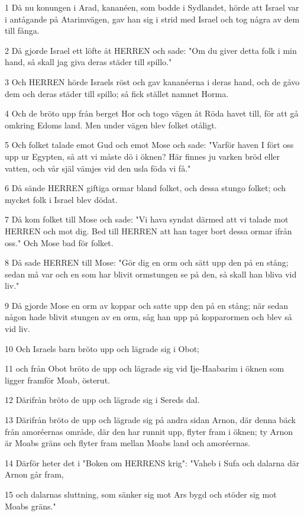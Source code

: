 \par 1 Då nu konungen i Arad, kananéen, som bodde i Sydlandet, hörde att Israel var i antågande på Atarimvägen, gav han sig i strid med Israel och tog några av dem till fånga.
\par 2 Då gjorde Israel ett löfte åt HERREN och sade: "Om du giver detta folk i min hand, så skall jag giva deras städer till spillo."
\par 3 Och HERREN hörde Israels röst och gav kananéerna i deras hand, och de gåvo dem och deras städer till spillo; så fick stället namnet Horma.
\par 4 Och de bröto upp från berget Hor och togo vägen åt Röda havet till, för att gå omkring Edoms land. Men under vägen blev folket otåligt.
\par 5 Och folket talade emot Gud och emot Mose och sade: "Varför haven I fört oss upp ur Egypten, så att vi måste dö i öknen? Här finnes ju varken bröd eller vatten, och vår själ vämjes vid den usla föda vi få."
\par 6 Då sände HERREN giftiga ormar bland folket, och dessa stungo folket; och mycket folk i Israel blev dödat.
\par 7 Då kom folket till Mose och sade: "Vi hava syndat därmed att vi talade mot HERREN och mot dig. Bed till HERREN att han tager bort dessa ormar ifrån oss." Och Mose bad för folket.
\par 8 Då sade HERREN till Mose: "Gör dig en orm och sätt upp den på en stång; sedan må var och en som har blivit ormstungen se på den, så skall han bliva vid liv."
\par 9 Då gjorde Mose en orm av koppar och satte upp den på en stång; när sedan någon hade blivit stungen av en orm, såg han upp på kopparormen och blev så vid liv.
\par 10 Och Israels barn bröto upp och lägrade sig i Obot;
\par 11 och från Obot bröto de upp och lägrade sig vid Ije-Haabarim i öknen som ligger framför Moab, österut.
\par 12 Därifrån bröto de upp och lägrade sig i Sereds dal.
\par 13 Därifrån bröto de upp och lägrade sig på andra sidan Arnon, där denna bäck från amoréernas område, där den har runnit upp, flyter fram i öknen; ty Arnon är Moabs gräns och flyter fram mellan Moabs land och amoréernas.
\par 14 Därför heter det i "Boken om HERRENS krig": "Vaheb i Sufa och dalarna där Arnon går fram,
\par 15 och dalarnas sluttning, som sänker sig mot Ars bygd och stöder sig mot Moabs gräns."
